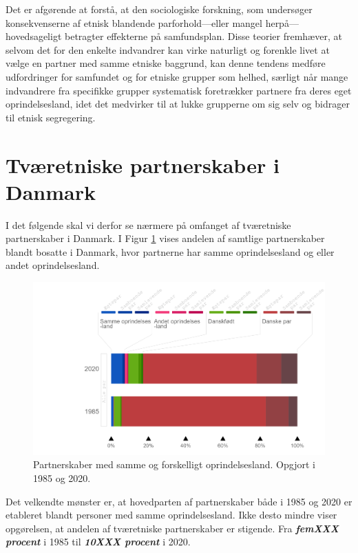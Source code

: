 \documentclass[
]{book}
\begin{document}
Det er afgørende at forstå, at den sociologiske forskning, som undersøger konsekvenserne af etnisk blandende parforhold---eller mangel herpå---hovedsageligt betragter effekterne på samfundsplan. Disse teorier fremhæver, at selvom det for den enkelte indvandrer kan virke naturligt og forenkle livet at vælge en partner med samme etniske baggrund, kan denne tendens medføre udfordringer for samfundet og for etniske grupper som helhed, særligt når mange indvandrere fra specifikke grupper systematisk foretrækker partnere fra deres eget oprindelsesland, idet det medvirker til at lukke grupperne om sig selv og bidrager til etnisk segregering.

\section{Tværetniske partnerskaber i Danmark}\label{tvuxe6retniske-partnerskaber-i-danmark}

I det følgende skal vi derfor se nærmere på omfanget af tværetniske partnerskaber i Danmark. I Figur \ref{fig:fig-2-1} vises andelen af samtlige partnerskaber blandt bosatte i Danmark, hvor partnerne har samme oprindelsesland og eller andet oprindelsesland.

\begin{figure}
\includegraphics[width=1\linewidth]{images/figur_intergruppepartnerskaber_alle} \caption{ Partnerskaber med samme og forskelligt oprindelsesland. Opgjort i 1985 og 2020.}\label{fig:fig-2-1}
\end{figure}

Det velkendte mønster er, at hovedparten af partnerskaber både i 1985 og 2020 er etableret blandt personer med samme oprindelsesland. Ikke desto mindre viser opgørelsen, at andelen af tværetniske partnerskaber er stigende. Fra \textbf{\emph{femXXX procent}} i 1985 til \textbf{\emph{10XXX procent}} i 2020.
\end{document}

